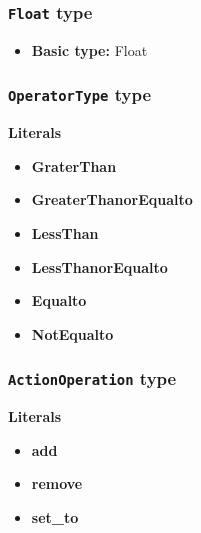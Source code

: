 \subsubsection{\texttt{Float} type}

\begin{itemize}
\item \textbf{Basic type:} Float
\end{itemize}
\subsubsection{\texttt{OperatorType} type}

\textbf{Literals}
\begin{itemize}
\item \textbf{GraterThan} 
\end{itemize}
\begin{itemize}
\item \textbf{GreaterThanorEqualto} 
\end{itemize}
\begin{itemize}
\item \textbf{LessThan} 
\end{itemize}
\begin{itemize}
\item \textbf{LessThanorEqualto} 
\end{itemize}
\begin{itemize}
\item \textbf{Equalto} 
\end{itemize}
\begin{itemize}
\item \textbf{NotEqualto} 
\end{itemize}

\subsubsection{\texttt{ActionOperation} type}

\textbf{Literals}
\begin{itemize}
\item \textbf{add} 
\end{itemize}
\begin{itemize}
\item \textbf{remove} 
\end{itemize}
\begin{itemize}
\item \textbf{set\_to} 
\end{itemize}

